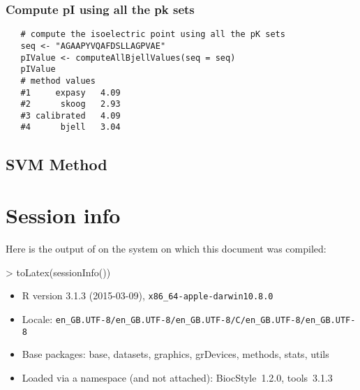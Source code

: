 \documentclass{article}
\begin{document}
\subsubsection{Compute pI using all the pk sets}

\begin{verbatim}
   # compute the isoelectric point using all the pK sets
   seq <- "AGAAPYVQAFDSLLAGPVAE"
   pIValue <- computeAllBjellValues(seq = seq)
   pIValue
   # method values
   #1     expasy   4.09
   #2      skoog   2.93
   #3 calibrated   4.09
   #4      bjell   3.04
\end{verbatim}

\subsection{SVM Method}


\section{Session info}

Here is the output of  on the system on which
this document was compiled:
\begin{Schunk}
\begin{Sinput}
> toLatex(sessionInfo())
\end{Sinput}
\begin{itemize}\raggedright
  \item R version 3.1.3 (2015-03-09), \verb|x86_64-apple-darwin10.8.0|
  \item Locale: \verb|en_GB.UTF-8/en_GB.UTF-8/en_GB.UTF-8/C/en_GB.UTF-8/en_GB.UTF-8|
  \item Base packages: base, datasets, graphics, grDevices, methods, stats,
    utils
  \item Loaded via a namespace (and not attached): BiocStyle~1.2.0, tools~3.1.3
\end{itemize}\end{Schunk}


\end{document}
